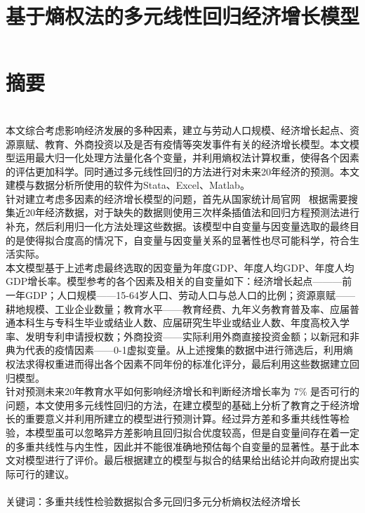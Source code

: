\documentclass[UTF8]{article}
\begin{document}
	\title{\vspace{+10pt} \heiti \textbf {基于熵权法的多元线性回归经济增长模型}}
	\author{}
	\date{}
	\maketitle
	\vspace{-70pt}
	\section*{\centering \heiti 摘要}
		\vspace{-20pt}
		~\\\indent 
		\songti
		本文综合考虑影响经济发展的多种因素，建立与劳动人口规模、经济增长起点、资源禀赋、教育、外商投资以及是否有疫情等突发事件有关的经济增长模型。本文模型运用最大归一化处理方法量化各个变量，并利用熵权法计算权重，使得各个因素的评估更加科学。同时通过多元线性回归的方法进行对未来20年经济的预测。本文建模与数据分析所使用的软件为Stata、Excel、Matlab。
		\\\indent 针对建立考虑多因素的经济增长模型的问题，首先从国家统计局官网~\cite{NBS} 根据需要搜集近20年经济数据，对于缺失的数据则使用三次样条插值法和回归方程预测法进行补充，然后利用归一化方法处理这些数据。该模型中自变量与因变量选取的最终目的是使得拟合度高的情况下，自变量与因变量关系的显著性也尽可能科学，符合生活实际。
		\\\indent
		本文模型基于上述考虑最终选取的因变量为年度GDP、年度人均GDP、年度人均GDP增长率。模型参考的各个因素及相关的自变量如下：经济增长起点———前一年GDP；人口规模——15-64岁人口、劳动人口与总人口的比例；资源禀赋——耕地规模、工业企业数量；教育水平——教育经费、九年义务教育普及率、应届普通本科生与专科生毕业或结业人数、应届研究生毕业或结业人数、年度高校入学率、发明专利申请授权数；外商投资——实际利用外商直接投资金额；以新冠和非典为代表的疫情因素——0-1虚拟变量。从上述搜集的数据中进行筛选后，利用熵权法求得权重进而得出各个因素不同年份的标准化评分，最后利用这些数据建立回归模型。
		\\\indent 
		针对预测未来20年教育水平如何影响经济增长和判断经济增长率为 7\% 是否可行的问题，本文使用多元线性回归的方法，在建立模型的基础上分析了教育之于经济增长的重要意义并利用所建立的模型进行预测计算。经过异方差和多重共线性等检验，本模型虽可以忽略异方差影响且回归拟合优度较高，但是自变量间存在着一定的多重共线性与内生性，因此并不能很准确地预估每个自变量的显著性。基于此本文对模型进行了评价。最后根据建立的模型与拟合的结果给出结论并向政府提出实际可行的建议。
		\\
		\\{\heiti 关键词：多重共线性检验\quad 数据拟合\quad 多元回归\quad 多元分析\quad 熵权法\quad 经济增长}
	\newpage
\end{document}
